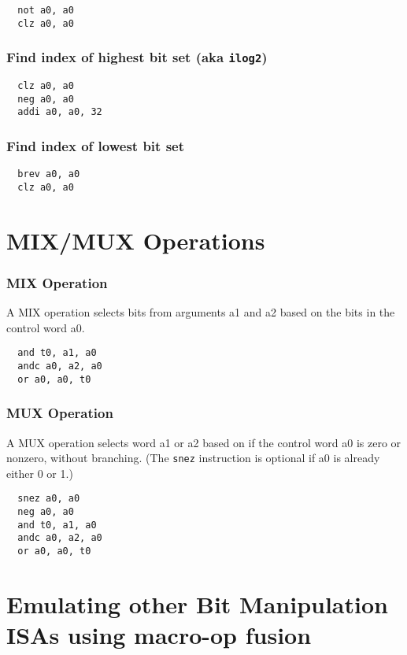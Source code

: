 \begin{verbatim}
  not a0, a0
  clz a0, a0
\end{verbatim}

\subsubsection{Find index of highest bit set (aka \texttt{ilog2})}

\begin{verbatim}
  clz a0, a0
  neg a0, a0
  addi a0, a0, 32
\end{verbatim}

\subsubsection{Find index of lowest bit set}

\begin{verbatim}
  brev a0, a0
  clz a0, a0
\end{verbatim}

\section{MIX/MUX Operations}

\subsubsection{MIX Operation}

A MIX operation selects bits from arguments a1 and a2 based on the bits in
the control word a0.

\begin{verbatim}
  and t0, a1, a0
  andc a0, a2, a0
  or a0, a0, t0
\end{verbatim}

\subsubsection{MUX Operation}

A MUX operation selects word a1 or a2 based on if the control word a0 is
zero or nonzero, without branching. (The {\tt snez} instruction is optional
if a0 is already either 0 or 1.)

\begin{verbatim}
  snez a0, a0
  neg a0, a0
  and t0, a1, a0
  andc a0, a2, a0
  or a0, a0, t0
\end{verbatim}

\section{Emulating other Bit Manipulation ISAs using macro-op fusion}

